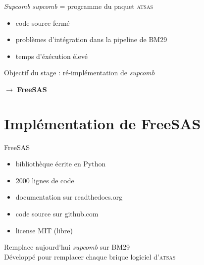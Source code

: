 \documentclass{beamer}
\begin{document}
\begin{frame}{\textit{Supcomb}}
\textit{supcomb} = programme du paquet \textsc{atsas}
\begin{itemize}
  \item code source ferm\'e
  \item probl\`emes d'int\'egration dans la pipeline de BM29
  \item temps d'\'ex\'ecution \'elev\'e
\end{itemize}

\vspace{1cm}

Objectif du stage : r\'e-impl\'ementation de \textit{supcomb}\\
\begin{center} $\longrightarrow$ \textbf{FreeSAS} \end{center}

\end{frame}

\section{Impl\'ementation de FreeSAS}

\begin{frame}{FreeSAS}

\begin{itemize}
\item biblioth\`eque \'ecrite en Python
\item 2000 lignes de code
\item documentation sur readthedocs.org
\item code source sur github.com
\item license MIT (libre)
\end{itemize}

Remplace aujourd'hui \textit{supcomb} sur BM29\\
D\'evelopp\'e pour remplacer chaque brique logiciel d'\textsc{atsas}

\end{frame}
\end{document}
